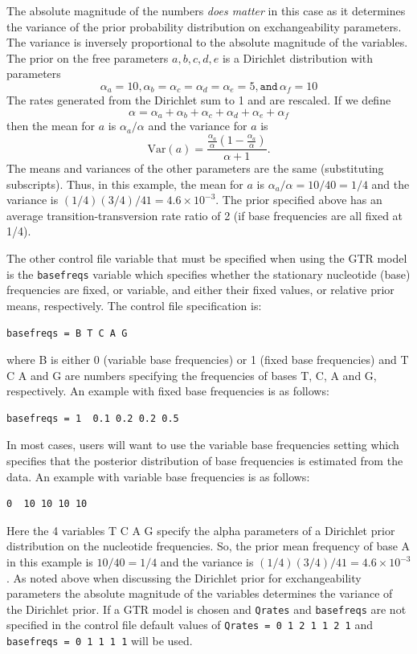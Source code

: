 \documentclass[a4paper]{book}
\numberwithin{equation}{section} \renewcommand{\baselinestretch}{0.55}
\begin{document}
The absolute magnitude of the numbers \emph{does matter} in this case
as it determines the variance of the prior probability distribution on
exchangeability parameters. The variance is inversely proportional to
the absolute magnitude of the variables. The prior on the free
parameters $a, b, c, d, e$ is a Dirichlet distribution with parameters
\begin{displaymath}
  \alpha_a = 10, \alpha_b = \alpha_c = \alpha_d = \alpha_e = 5, \texttt{and} \, \alpha_f = 10 
\end{displaymath}
The rates generated from the Dirichlet sum to 1 and are rescaled.  If
we define
\begin{displaymath}
  \alpha = \alpha_a + \alpha_b + \alpha_c + \alpha_d + \alpha_e + \alpha_f
\end{displaymath}
then the mean for $a$ is $\alpha_a/\alpha$ and the variance for $a$ is
\begin{displaymath}
  \textrm{Var}(a) = \frac{\frac{\alpha_a}{\alpha}\left(1-\frac{\alpha_a}{\alpha}\right)}{\alpha + 1}.
\end{displaymath}
The means and variances of the other parameters are the same
(substituting subscripts).  Thus, in this example, the mean for $a$ is
$\alpha_a/\alpha = 10/40 = 1/4$ and the variance is
$(1/4)(3/4)/41 = 4.6 \times 10^{-3}$.  The prior specified above has
an average transition-transversion rate ratio of 2 (if base
frequencies are all fixed at 1/4).

The other control file variable that must be specified when using the
GTR model is the \texttt{basefreqs} variable which specifies whether
the stationary nucleotide (base) frequencies are fixed, or variable,
and either their fixed values, or relative prior means,
respectively. The control file specification is:
\begin{verbatim}
basefreqs = B T C A G
\end{verbatim}
where B is either 0 (variable base frequencies) or 1 (fixed base
frequencies) and T C A and G are numbers specifying the frequencies of
bases T, C, A and G, respectively.  An example with fixed base
frequencies is as follows:
\begin{verbatim}
basefreqs = 1  0.1 0.2 0.2 0.5
\end{verbatim}
In most cases, users will want to use the variable base frequencies
setting which specifies that the posterior distribution of base
frequencies is estimated from the data. An example with variable base
frequencies is as follows:
\begin{verbatim}
0  10 10 10 10
\end{verbatim}
Here the 4 variables T C A G specify the alpha parameters of a
Dirichlet prior distribution on the nucleotide frequencies. So, the
prior mean frequency of base A in this example is $10/40 = 1/4$ and
the variance is $(1/4)(3/4)/41 = 4.6 \times 10^{-3}$. As noted above
when discussing the Dirichlet prior for exchangeability parameters the
absolute magnitude of the variables determines the variance of the
Dirichlet prior.
If a GTR model is chosen and \texttt{Qrates} and \texttt{basefreqs} are
not specified in the control file default values of \texttt{Qrates = 0 1 2 1 1 2 1}
and \texttt{basefreqs = 0 1 1 1 1} will be used.
\end{document}
